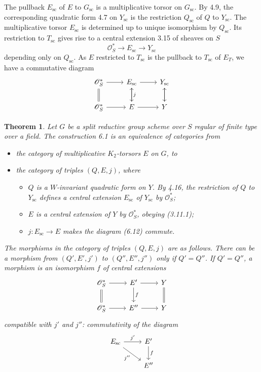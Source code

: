 \documentclass[11pt,a4paper]{article}
\theoremstyle{plain}
\newtheorem{theorem}{Theorem}[section]
\theoremstyle{definition}
\newcommand{\cO}{\mathcal{O}}
\newcommand{\scu}{\mathrm{sc}}
\begin{document}
The pullback $E_\scu$ of $E$ to $G_\scu$ is a multiplicative torsor on $G_\scu$. By 4.9, the corresponding quadratic form 4.7 on $Y_\scu$ is the restriction $Q_\scu$ of $Q$ to $Y_\scu$. The multiplicative torsor $E_\scu$ is determined up to unique isomorphism by $Q_\scu$. Its restriction to $T_\scu$ gives rise to a central extension 3.15 of sheaves on $S$
\begin{equation}\label{eq:6.1.1}
\cO^*_S \to E_\scu \to Y_\scu
\end{equation}
depending only on $Q_\scu$. As $E$ restricted to $T_\scu$ is the pullback to $T_\scu$ of $E_T$, we have a commutative diagram
\begin{equation}\label{eq:6.1.2}
\begin{tikzcd}
\cO^*_S \arrow[r] \arrow[d, equal] & E_\scu \arrow[r] \arrow[d] & Y_\scu \arrow[d] \\
\cO^*_S \arrow[r] & E \arrow[r] \arrow[u, "j"'] & Y \arrow[u]
\end{tikzcd}
\end{equation}

\begin{theorem}\label{thm:6.2}
Let $G$ be a split reductive group scheme over $S$ regular of finite type over a field. The construction 6.1 is an equivalence of categories from
\begin{itemize}
\item[(i)] the category of multiplicative $K_2$-torsors $E$ on $G$, to
\item[(ii)] the category of triples $(Q, E, j)$, where
\begin{itemize}
\item[(a)] $Q$ is a $W$-invariant quadratic form on $Y$. By 4.16, the restriction of $Q$ to $Y_\scu$ defines a central extension $E_\scu$ of $Y_\scu$ by $\cO^*_S$;
\item[(b)] $E$ is a central extension of $Y$ by $\cO^*_S$, obeying \textup{(3.11.1)};
\item[(c)] $j: E_\scu \to E$ makes the diagram \textup{(6.12)} commute.
\end{itemize}
\end{itemize}
The morphisms in the category of triples $(Q, E, j)$ are as follows. There can be a morphism from $(Q', E', j')$ to $(Q'', E'', j'')$ only if $Q' = Q''$. If $Q' = Q''$, a morphism is an isomorphism $f$ of central extensions
\[
\begin{tikzcd}
\cO^*_S \arrow[r] \arrow[d, equal] & E' \arrow[r] \arrow[d, "f"] & Y \arrow[d, equal] \\
\cO^*_S \arrow[r] & E'' \arrow[r] & Y
\end{tikzcd}
\]
compatible with $j'$ and $j''$: commutativity of the diagram
\[
\begin{tikzcd}
E_\scu \arrow[r, "{j'}"] \arrow[rd, "{j''}"'] & E' \arrow[d, "f"] \\
& E''
\end{tikzcd}
\]
\end{theorem}
\end{document}
